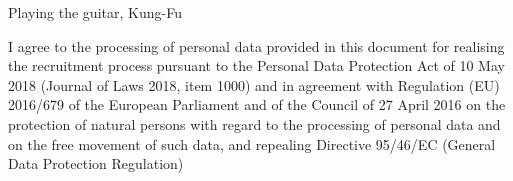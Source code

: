 \documentclass{cvClass} %
\begin{document}
   {Playing the guitar, Kung-Fu}

  \vfill
    {I agree to the processing of personal data provided in this document for realising the recruitment process pursuant to the Personal Data Protection Act of 10 May 2018 (Journal of Laws 2018, item 1000) and in agreement with Regulation (EU) 2016/679 of the European Parliament and of the Council of 27 April 2016 on the protection of natural persons with regard to the processing of personal data and on the free movement of such data, and repealing Directive 95/46/EC (General Data Protection Regulation)}

\end{document}
